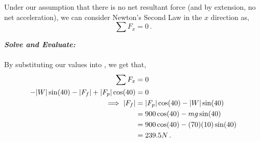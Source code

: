 \begin{subquestions}
\begin{subsubquestions}
Under our assumption that there is no net resultant force (and by extension, no net acceleration), we can consider Newton's Second Law in the $x$ direction as, 
\begin{equation}
	\sum F_x = 0 \,. \label{2011:q6:Newt1}
\end{equation}




\textbf{\textit{Solve and Evaluate:}} \\ \\
By substituting our values into , we get that,
\begin{align}
	\sum F_x & = 0 \nonumber \\
	-|W|\sin(40)-|F_f|+|F_p|\cos(40) & = 0 \nonumber \\
	\implies |F_f| & = |F_p|\cos(40)-|W|\sin(40) \nonumber \\
	               & = 900\cos(40)-mg\sin(40) \nonumber \\
	               & = 900\cos(40)-(70)(10)\sin(40) \nonumber \\
	               & = 239.5N \,.
\end{align}

\end{subsubquestions}
	
	
	
	
\end{subquestions}





















